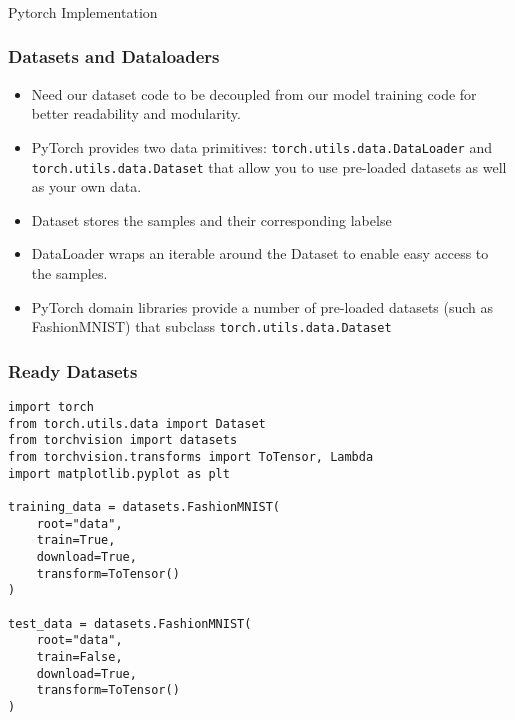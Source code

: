 \begin{frame}[fragile]\frametitle{}

\begin{center}
{\Large Pytorch Implementation}
\end{center}
\end{frame}

\begin{frame}[fragile]
\frametitle{Datasets and Dataloaders}

\begin{itemize}
\item Need our dataset code to be decoupled from our model training code for better readability and modularity. 
\item PyTorch provides two data primitives: \lstinline|torch.utils.data.DataLoader| and \lstinline|torch.utils.data.Dataset| that allow you to use pre-loaded datasets as well as your own data. 
\item Dataset stores the samples and their corresponding labelse
\item  DataLoader wraps an iterable around the Dataset to enable easy access to the samples.
\item PyTorch domain libraries provide a number of pre-loaded datasets (such as FashionMNIST) that subclass \lstinline|torch.utils.data.Dataset|
\end{itemize}

\end{frame} 

\begin{frame}[fragile]
\frametitle{Ready Datasets}

\begin{lstlisting}
import torch
from torch.utils.data import Dataset
from torchvision import datasets
from torchvision.transforms import ToTensor, Lambda
import matplotlib.pyplot as plt

training_data = datasets.FashionMNIST(
    root="data",
    train=True,
    download=True,
    transform=ToTensor()
)

test_data = datasets.FashionMNIST(
    root="data",
    train=False,
    download=True,
    transform=ToTensor()
)
\end{lstlisting}

\end{frame} 

